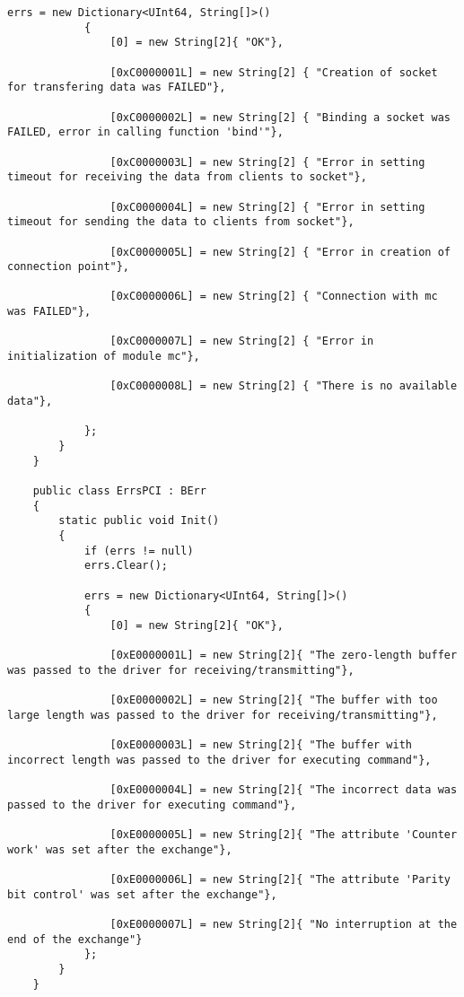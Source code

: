 \begin{lstlisting}[label=err,caption=Ошибки]
			errs = new Dictionary<UInt64, String[]>()
			{
				[0] = new String[2]{ "OK"},
				
				[0xC0000001L] = new String[2] { "Creation of socket for transfering data was FAILED"},
				
				[0xC0000002L] = new String[2] { "Binding a socket was FAILED, error in calling function 'bind'"},
				
				[0xC0000003L] = new String[2] { "Error in setting timeout for receiving the data from clients to socket"},
				
				[0xC0000004L] = new String[2] { "Error in setting timeout for sending the data to clients from socket"},
				
				[0xC0000005L] = new String[2] { "Error in creation of connection point"},
				
				[0xC0000006L] = new String[2] { "Connection with mc was FAILED"},
				
				[0xC0000007L] = new String[2] { "Error in initialization of module mc"},
				
				[0xC0000008L] = new String[2] { "There is no available data"},
				
			};
		}
	}

    public class ErrsPCI : BErr
	{                        
		static public void Init()
		{
			if (errs != null)
			errs.Clear();
			
			errs = new Dictionary<UInt64, String[]>()
			{
				[0] = new String[2]{ "OK"},
				
				[0xE0000001L] = new String[2]{ "The zero-length buffer was passed to the driver for receiving/transmitting"},
				
				[0xE0000002L] = new String[2]{ "The buffer with too large length was passed to the driver for receiving/transmitting"},
				
				[0xE0000003L] = new String[2]{ "The buffer with incorrect length was passed to the driver for executing command"},
				
				[0xE0000004L] = new String[2]{ "The incorrect data was passed to the driver for executing command"},
				
				[0xE0000005L] = new String[2]{ "The attribute 'Counter work' was set after the exchange"},
				
				[0xE0000006L] = new String[2]{ "The attribute 'Parity bit control' was set after the exchange"},
				
				[0xE0000007L] = new String[2]{ "No interruption at the end of the exchange"}
			};
		}
	}


\end{lstlisting}
